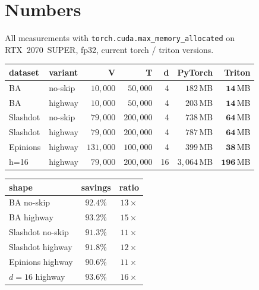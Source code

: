 \documentclass[11pt,a4paper]{article}
\begin{document}
\section{Numbers}

All measurements with \texttt{torch.cuda.max\_memory\_allocated} on
RTX~2070~SUPER, fp32, current torch / triton versions.

\begin{center}\small
\begin{tabular}{l l r r r r r}
\toprule
\textbf{dataset} & \textbf{variant} & \textbf{V} & \textbf{T} & \textbf{d}
& \textbf{PyTorch} & \textbf{Triton} \\
\midrule
BA       & no-skip  & $10{,}000$  & $50{,}000$  & 4   & $182\,$MB    & $\mathbf{14\,}$MB    \\
BA       & highway  & $10{,}000$  & $50{,}000$  & 4   & $203\,$MB    & $\mathbf{14\,}$MB    \\
Slashdot & no-skip  & $79{,}000$  & $200{,}000$ & 4   & $738\,$MB    & $\mathbf{64\,}$MB    \\
Slashdot & highway  & $79{,}000$  & $200{,}000$ & 4   & $787\,$MB    & $\mathbf{64\,}$MB    \\
Epinions & highway  & $131{,}000$ & $100{,}000$ & 4   & $399\,$MB    & $\mathbf{38\,}$MB    \\
h=16     & highway  & $79{,}000$  & $200{,}000$ & 16  & $3{,}064\,$MB & $\mathbf{196\,}$MB \\
\bottomrule
\end{tabular}
\end{center}

\begin{center}
\begin{tabular}{l c c}
\toprule
\textbf{shape} & \textbf{savings} & \textbf{ratio} \\
\midrule
BA no-skip       & $\mathbf{92.4\%}$ & $13\times$ \\
BA highway       & $\mathbf{93.2\%}$ & $15\times$ \\
Slashdot no-skip & $\mathbf{91.3\%}$ & $11\times$ \\
Slashdot highway & $\mathbf{91.8\%}$ & $12\times$ \\
Epinions highway & $\mathbf{90.6\%}$ & $11\times$ \\
$d=16$ highway   & $\mathbf{93.6\%}$ & $16\times$ \\
\bottomrule
\end{tabular}
\end{center}
\end{document}
